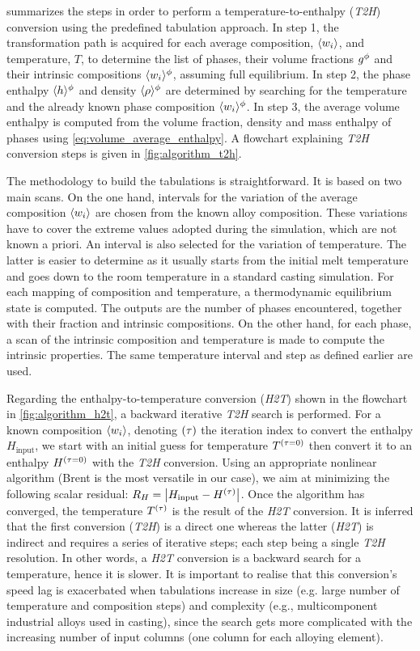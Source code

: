  summarizes the 
steps in order to perform a temperature-to-enthalpy (\emph{T2H}) conversion using the predefined tabulation 
approach. 
In step 1, the transformation path is acquired for each average composition, $\langle w_i \rangle$, and temperature, $T$, 
to determine the list of phases, their volume fractions ${g^{\phi}} $ and their intrinsic compositions $\langle w_i \rangle^{\phi}$, assuming
full equilibrium. In step 2, the phase enthalpy $\langle h \rangle^{\phi} $  and density $\langle \rho \rangle^{\phi} $ are determined by searching for the temperature and 
the already known phase composition $\langle w_i \rangle^{\phi}$. In step 3, the average volume enthalpy is computed from the 
volume fraction, density and mass enthalpy of phases using \cref{eq:volume_average_enthalpy}. 
A flowchart explaining \emph{T2H} conversion steps is given in \cref{fig:algorithm_t2h}.



The methodology to build the tabulations is straightforward. It is based on two main scans. On the one hand, intervals for the variation of the 
average composition $\langle w_i \rangle$ are chosen from the known alloy composition. These variations have to cover the extreme values adopted during the 
simulation, which are not known a priori. An interval is also selected for the variation of temperature. The latter is easier to determine as it
usually starts from the initial melt temperature and goes down to the room temperature in a standard casting simulation. For each mapping of
composition and temperature, a thermodynamic equilibrium state is computed. The outputs are the 
number of phases encountered, together with their fraction and intrinsic compositions. 
On the other hand, for each phase, a scan of the intrinsic composition and temperature is made to compute the intrinsic 
properties. The same temperature interval and step as defined earlier are used.

Regarding the enthalpy-to-temperature conversion (\emph{H2T}) shown in the flowchart in \cref{fig:algorithm_h2t}, 
a backward iterative \emph{T2H} search is performed. 
For a known composition $\langle w_i \rangle$, denoting ${\left( \tau \right)}$ the iteration index to convert the enthalpy 
$H_{\text{input}}$, we start with an initial guess for temperature $T^{{\left( \tau=0 \right)}}$ then convert it to an 
enthalpy $H^{{\left( \tau=0 \right)}}$ with the \emph{T2H} conversion. Using an appropriate nonlinear algorithm (Brent is the most versatile 
in our case), we aim at minimizing the following scalar residual: $R_{H} = \left | H_{\text{input}} - H^{{\left( \tau \right)}}  \right |$. 
Once the algorithm has converged, the temperature $T^{{\left( \tau \right)}}$ is the result of the \emph{H2T} conversion. It is 
inferred that the first conversion (\emph{T2H}) is a direct one whereas the latter (\emph{H2T}) is indirect and requires 
a series of iterative steps; each step being a single \emph{T2H} resolution. In other words, a \emph{H2T} conversion is a 
backward search for a temperature, hence it is slower. It is important to realise that this conversion's speed lag is exacerbated 
when tabulations increase in size (e.g. large number of temperature and composition steps) and complexity (e.g., multicomponent 
industrial alloys used in casting), since the search gets more complicated with the increasing number of input 
columns (one column for each alloying element).

